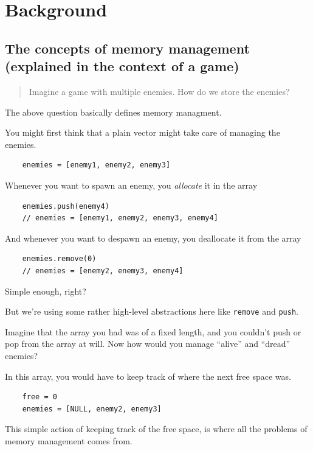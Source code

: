 \documentclass[index]{subfiles}
\begin{document}
\section{Background}

\subsection{The concepts of memory management (explained in the context of a game)}

\begin{quote}
    Imagine a game with multiple enemies. How do we store the enemies?
\end{quote}

The above question basically defines memory managment.

You might first think that a plain vector might take care of managing the enemies.

\begin{verbatim}
    enemies = [enemy1, enemy2, enemy3]
\end{verbatim}

Whenever you want to spawn an enemy, you \textit{allocate} it in the array

\begin{verbatim}
    enemies.push(enemy4)
    // enemies = [enemy1, enemy2, enemy3, enemy4]
\end{verbatim}

And whenever you want to despawn an enemy, you deallocate it from the array

\begin{verbatim}
    enemies.remove(0)
    // enemies = [enemy2, enemy3, enemy4]
\end{verbatim}

Simple enough, right?

But we're using some rather high-level abstractions here like \verb+remove+ and \verb+push+.

Imagine that the array you had was of a fixed length, and you couldn't push or pop from the array at will. Now how would you manage ``alive'' and ``dread'' enemies?

In this array, you would have to keep track of where the next free space was.

\begin{verbatim}
    free = 0
    enemies = [NULL, enemy2, enemy3]
\end{verbatim}

This simple action of keeping track of the free space, is where all the problems of memory management comes from.
\end{document}
